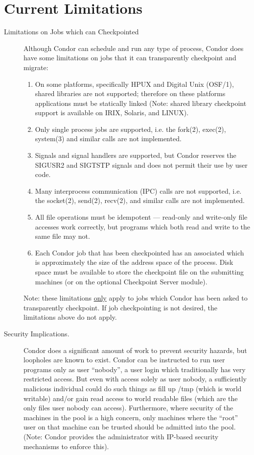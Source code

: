 \section{\label{sec:current-limitations}Current Limitations}

\begin{description}

	\item[Limitations on Jobs which can Checkpointed] Although Condor can schedule and
run any type of process, Condor does have some limitations on jobs that it can
transparently checkpoint and migrate:
\begin{enumerate}
	\item On some platforms, specifically HPUX and Digital Unix
(OSF/1), shared libraries are not supported; therefore on these
platforms applications must be statically linked (Note: shared library
checkpoint support is available on IRIX, Solaris, and LINUX). 
	\item Only single process jobs are supported, i.e. the fork(2), exec(2),
system(3) and similar calls are not implemented.
	\item Signals and signal handlers are supported, but Condor reserves the 
SIGUSR2 and SIGTSTP signals and does not permit their use by user code.
	\item Many interprocess communication (IPC) calls are not supported, i.e. the 
socket(2), send(2), recv(2), and similar calls are not implemented.
	\item All file operations must be idempotent --- read-only and write-only file 
accesses work correctly, but programs which both read and write to the 
same file may not.
	\item Each Condor job that has been checkpointed has an associated 
 which is approximately the size of the address space of the 
process. Disk space must be available to store the checkpoint file on the 
submitting machines (or on the optional Checkpoint Server module).
\end{enumerate}

	Note: these limitations \underline{only} apply to jobs which Condor
has been asked to transparently checkpoint.  If job checkpointing is not
desired, the limitations above do not apply.

	\item[Security Implications.] Condor does a significant amount of work to prevent 
security hazards, but loopholes are known to exist.  Condor can be instructed 
to run user programs only as user ``nobody'', a user login which traditionally has very 
restricted access.  But even with access solely as user nobody, a sufficiently 
malicious individual could do such things as fill up /tmp (which is world writable) and/or gain 
read access to world readable files (which are the only files user nobody can 
access).  Furthermore, where security of the machines in the pool is a high concern, 
only machines where the ``root'' user on that machine can be trusted should be admitted
into the pool.  (Note: Condor provides the administrator with IP-based security mechanisms 
to enforce this).


\end{description}
